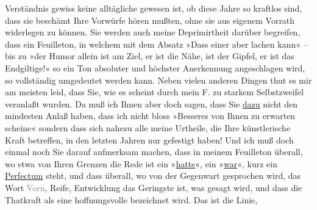 \begin{ledgroupsized}[t]{13cm}
               Verständnis gewiss keine alltägliche gewesen ist, ob diese Jahre so kraftlos sind,
               dass sie beschämt Ihre Vorwürfe hören mußten, ohne sie aus eigenem Vorrath widerlegen
               zu können. \pend
           \pstart
           Sie werden auch meine Deprimirtheit darüber begreifen, dass ein Feuilleton, in
               welchem mit dem Absatz »Dass einer
                  aber lachen kann« – bis zu »der Humor allein ist am Ziel, er ist die Nähe, ist der Gipfel, er ist das
                  Endgiltige!« so ein Ton absoluter und höchster Anerkennung angeschlagen wird,
               so vollständig umgedeutet werden kann. \pend
           \pstart
           Neben vielen anderen Dingen thut es mir am meisten leid, dass Sie, wie es scheint
               durch mein F. zu starkem
               Selbstzweifel veranlaßt wurden. Da muß ich Ihnen aber doch sagen, dass Sie \uline{dazu} nicht den mindesten Anlaß haben, dass ich nicht
               bloss »Besseres von Ihnen zu erwarten scheine« sondern dass sich nahezu alle meine
               Urtheile, die Ihre künstlerische Kraft betreffen, in den letzten Jahren nur gefestigt
               haben! Und ich muß {\pb}doch
               einmal noch Sie darauf aufmerksam machen, dass in meinem Feuilleton überall, wo etwa von Ihren
               Grenzen die Rede ist ein »\uline{hatte}«, ein »\uline{war}«, kurz ein \uline{Perfectum} steht, und dass überall, wo von der Gegenwart gesprochen wird, das
               Wort \textcolor{gray}{Vorn}, Reife, Entwicklung das Geringste ist, was gesagt wird,
               und dass die Thatkraft als eine hoffnungsvolle bezeichnet wird. Das ist die Linie,

\end{ledgroupsized}
